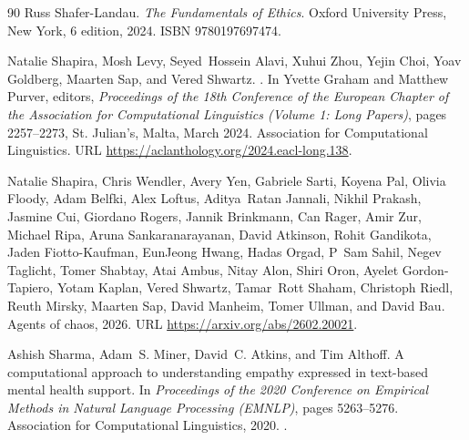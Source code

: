 \begin{thebibliography}{90}
Russ Shafer-Landau.
\newblock \emph{The Fundamentals of Ethics}.
\newblock Oxford University Press, New York, 6 edition, 2024.
\newblock ISBN 9780197697474.

Natalie Shapira, Mosh Levy, Seyed~Hossein Alavi, Xuhui Zhou, Yejin Choi, Yoav Goldberg, Maarten Sap, and Vered Shwartz.
.
\newblock In Yvette Graham and Matthew Purver, editors, \emph{Proceedings of the 18th Conference of the European Chapter of the Association for Computational Linguistics (Volume 1: Long Papers)}, pages 2257--2273, St. Julian{'}s, Malta, March 2024. Association for Computational Linguistics.
\newblock URL \url{https://aclanthology.org/2024.eacl-long.138}.

Natalie Shapira, Chris Wendler, Avery Yen, Gabriele Sarti, Koyena Pal, Olivia Floody, Adam Belfki, Alex Loftus, Aditya~Ratan Jannali, Nikhil Prakash, Jasmine Cui, Giordano Rogers, Jannik Brinkmann, Can Rager, Amir Zur, Michael Ripa, Aruna Sankaranarayanan, David Atkinson, Rohit Gandikota, Jaden Fiotto-Kaufman, EunJeong Hwang, Hadas Orgad, P~Sam Sahil, Negev Taglicht, Tomer Shabtay, Atai Ambus, Nitay Alon, Shiri Oron, Ayelet Gordon-Tapiero, Yotam Kaplan, Vered Shwartz, Tamar~Rott Shaham, Christoph Riedl, Reuth Mirsky, Maarten Sap, David Manheim, Tomer Ullman, and David Bau.
\newblock Agents of chaos, 2026.
\newblock URL \url{https://arxiv.org/abs/2602.20021}.

Ashish Sharma, Adam~S. Miner, David~C. Atkins, and Tim Althoff.
\newblock A computational approach to understanding empathy expressed in text-based mental health support.
\newblock In \emph{Proceedings of the 2020 Conference on Empirical Methods in Natural Language Processing (EMNLP)}, pages 5263--5276. Association for Computational Linguistics, 2020.
\newblock {}.


\end{thebibliography}
